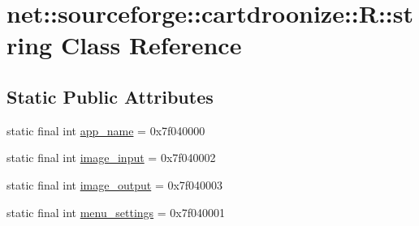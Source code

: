 \hypertarget{classnet_1_1sourceforge_1_1cartdroonize_1_1R_1_1string}{
\section{net::sourceforge::cartdroonize::R::string Class Reference}
\label{classnet_1_1sourceforge_1_1cartdroonize_1_1R_1_1string}
}
\subsection*{Static Public Attributes}
\begin{DoxyCompactItemize}
\item 
static final int \hyperlink{classnet_1_1sourceforge_1_1cartdroonize_1_1R_1_1string_a554de7e381d2d470c9d91294a524f9da}{app\_\-name} = 0x7f040000
\item 
static final int \hyperlink{classnet_1_1sourceforge_1_1cartdroonize_1_1R_1_1string_a3c725100bb4a0c8c7b70cf87a7462710}{image\_\-input} = 0x7f040002
\item 
static final int \hyperlink{classnet_1_1sourceforge_1_1cartdroonize_1_1R_1_1string_a102a7d2a9b152527d5c1207c4b143bc3}{image\_\-output} = 0x7f040003
\item 
static final int \hyperlink{classnet_1_1sourceforge_1_1cartdroonize_1_1R_1_1string_a3042f3578a6f658724721574d4682213}{menu\_\-settings} = 0x7f040001
\end{DoxyCompactItemize}


